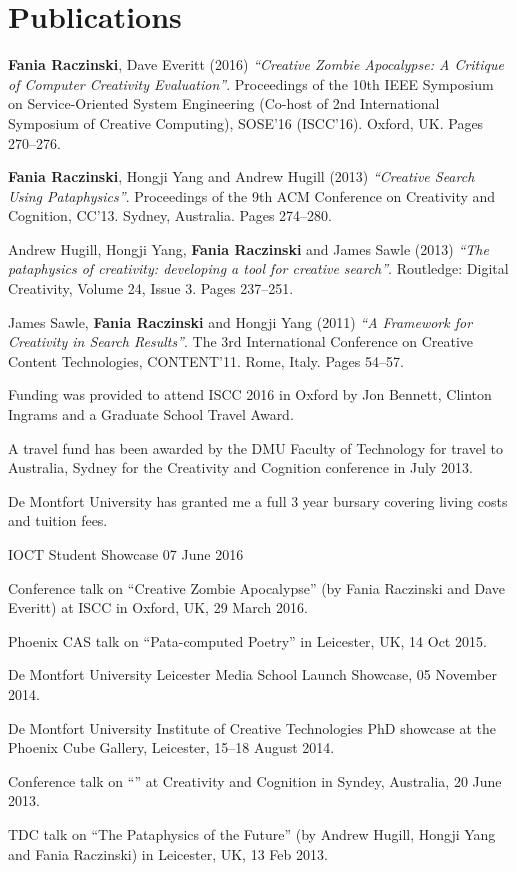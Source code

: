 
\pagestyle{empty}

\chapter{Publications}
\label{ch:pubs}

\textbf{Fania Raczinski}, Dave Everitt (2016) \emph{``Creative Zombie Apocalypse: A Critique of Computer Creativity Evaluation''}. Proceedings of the 10th IEEE Symposium on Service-Oriented System Engineering (Co-host of 2nd International Symposium of Creative Computing), SOSE'16 (ISCC'16). Oxford, UK. Pages 270--276.

\textbf{Fania Raczinski}, Hongji Yang and Andrew Hugill (2013) \emph{``Creative Search Using Pataphysics''}. Proceedings of the 9th ACM Conference on Creativity and Cognition, CC'13. Sydney, Australia. Pages 274--280.

Andrew Hugill, Hongji Yang, \textbf{Fania Raczinski} and James Sawle (2013) \emph{``The pataphysics of creativity: developing a tool for creative search''}. Routledge: Digital Creativity, Volume 24, Issue 3. Pages 237--251.

James Sawle, \textbf{Fania Raczinski} and Hongji Yang (2011) \emph{``A Framework for Creativity in Search Results''}. The 3rd International Conference on Creative Content Technologies, CONTENT'11. Rome, Italy. Pages 54--57.

\spirals

Funding was provided to attend ISCC 2016 in Oxford by Jon Bennett, Clinton Ingrams and a Graduate School Travel Award.

A travel fund has been awarded by the DMU Faculty of Technology for travel to Australia, Sydney for the Creativity and Cognition conference in July 2013.

De Montfort University has granted me a full 3 year bursary covering living costs and tuition fees.

\spirals


IOCT Student Showcase 07 June 2016

Conference talk on ``Creative Zombie Apocalypse'' (by Fania Raczinski and Dave Everitt) at ISCC in Oxford, UK, 29 March 2016.

Phoenix CAS talk on ``Pata-computed Poetry'' in Leicester, UK, 14 Oct 2015.

De Montfort University Leicester Media School Launch Showcase, 05 November 2014.

De Montfort University Institute of Creative Technologies PhD showcase at the Phoenix Cube Gallery, Leicester, 15--18 August 2014.

Conference talk on ``'' at Creativity and Cognition in Syndey, Australia, 20 June 2013.

TDC talk on ``The Pataphysics of the Future'' (by Andrew Hugill, Hongji Yang and Fania Raczinski) in Leicester, UK, 13 Feb 2013.

\clearpage
